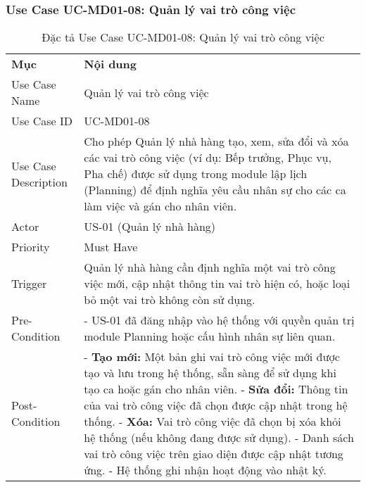 \subsubsection{Use Case UC-MD01-08: Quản lý vai trò công việc}


\begin{longtable}{|m{4cm}|p{11cm}|}
\caption{Đặc tả Use Case UC-MD01-08: Quản lý vai trò công việc} \label{tab:uc_md01_08} \\
\hline

\endhead %

\hline
\endfoot %

\hline
\endlastfoot %
\multicolumn{2}{|c|}{\textbf{2.1. Tóm tắt (Summary)}} \\
\hline
\textbf{Mục} & \textbf{Nội dung} \\
\hline
Use Case Name & Quản lý vai trò công việc \\
\hline
Use Case ID & UC-MD01-08 \\
\hline
Use Case Description & Cho phép Quản lý nhà hàng tạo, xem, sửa đổi và xóa các vai trò công việc (ví dụ: Bếp trưởng, Phục vụ, Pha chế) được sử dụng trong module lập lịch (Planning) để định nghĩa yêu cầu nhân sự cho các ca làm việc và gán cho nhân viên. \\
\hline
Actor & US-01 (Quản lý nhà hàng) \\
\hline
Priority & Must Have \\
\hline
Trigger & Quản lý nhà hàng cần định nghĩa một vai trò công việc mới, cập nhật thông tin vai trò hiện có, hoặc loại bỏ một vai trò không còn sử dụng. \\
\hline
Pre-Condition & - US-01 đã đăng nhập vào hệ thống với quyền quản trị module Planning hoặc cấu hình nhân sự liên quan. \\
\hline
Post-Condition & - \textbf{Tạo mới:} Một bản ghi vai trò công việc mới được tạo và lưu trong hệ thống, sẵn sàng để sử dụng khi tạo ca hoặc gán cho nhân viên. \newline - \textbf{Sửa đổi:} Thông tin của vai trò công việc đã chọn được cập nhật trong hệ thống. \newline - \textbf{Xóa:} Vai trò công việc đã chọn bị xóa khỏi hệ thống (nếu không đang được sử dụng). \newline - Danh sách vai trò công việc trên giao diện được cập nhật tương ứng. \newline - Hệ thống ghi nhận hoạt động vào nhật ký. \\
\hline

\end{longtable}
